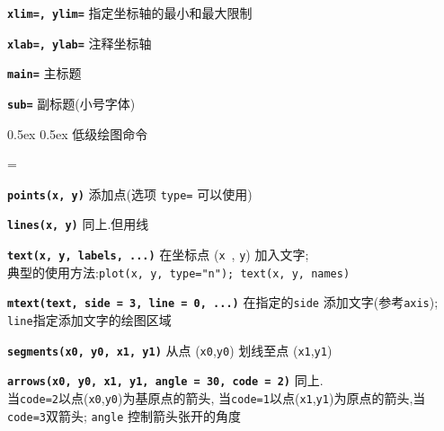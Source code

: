 \documentclass[landscape]{article}
\makeatletter
\renewcommand\section{\@startsection{section}{1}{0mm}%
                                     {0.5ex}%
                                     {0.5ex}%
                                {\color{black}\normalfont\large\bfseries}}
\newcommand{\code}{\texttt}
\newcommand{\bcode}[1]{\texttt{\textbf{#1}}}
\makeatother
\begin{document}
\begin{multicols*}{3}
\bcode{xlim=, ylim=}  指定坐标轴的最小和最大限制

\bcode{xlab=, ylab=}  注释坐标轴

\bcode{main=}  主标题

\bcode{sub=}  副标题(小号字体)


\vspace{2mm}
\section{低级绘图命令}

\everypar={\hangindent=9mm}

\bcode{points(x, y)}    添加点(选项 \code{type=} 可以使用)

\bcode{lines(x, y)} 同上.但用线


\bcode{text(x, y, \mbox{labels}, ...)} 在坐标点 (\code{x}~, \code{y}) 加入文字;      \\
典型的使用方法:\code{plot(x, y, type="n"); text(x, y, names)}


\bcode{mtext(text, side = 3, line = 0, ...)}    在指定的\code{side} 添加文字(参考\code{axis});
\code{line}指定添加文字的绘图区域

\bcode{segments(x0, y0, x1, y1)}    从点 (\code{x0},\code{y0}) 划线至点 (\code{x1},\code{y1})

\bcode{arrows(x0, y0, x1, y1, angle = 30, code = 2)} 同上.         \\
当\code{code=2}以点(\code{x0},\code{y0})为基原点的箭头,
当\code{code=1}以点(\code{x1},\code{y1})为原点的箭头,当\code{code=3}双箭头;
\code{angle} 控制箭头张开的角度


\end{multicols*}
\end{document}
